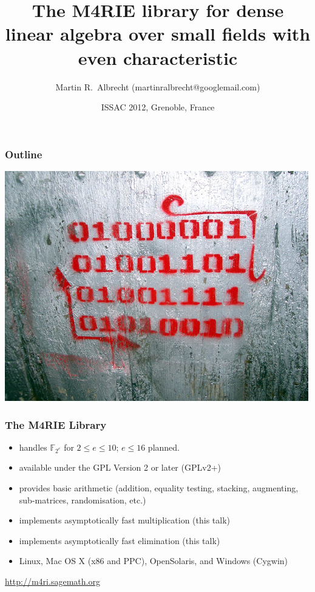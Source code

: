 \documentclass[11pt]{beamer}
\title{The M4RIE library for dense linear algebra over small fields with even characteristic}
\author{Martin R.\ Albrecht (martinralbrecht@googlemail.com)}
\institute{POLSYS Team, UPMC, Paris, France}
\date{ISSAC 2012, Grenoble, France}
\begin{document}
\begin{frame}
\titlepage
\end{frame}

\begin{frame}
\frametitle{Outline}
\tableofcontents
\begin{flushright}
\includegraphics[height=0.2\textwidth]{gf2.jpg}
\end{flushright}
\end{frame}

\begin{frame}
\frametitle{The M4RIE Library}
\begin{itemize}
\item handles $\mathbb{F}_{2^e}$ for $2 \leq e \leq 10$; $e \leq 16$ planned.
\item available under the GPL Version 2 or later (GPLv2+)
\item provides basic arithmetic (addition, equality testing, stacking, augmenting, sub-matrices, randomisation, etc.)
\item implements asymptotically fast multiplication (this talk)
\item implements asymptotically fast elimination (this talk)
\item Linux, Mac OS X (x86 and PPC), OpenSolaris, and Windows (Cygwin)
\end{itemize}

\begin{block}{}
\centering
\url{http://m4ri.sagemath.org} 
\end{block}
\end{frame}
\end{document}
